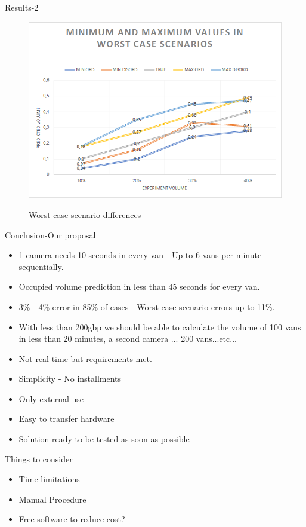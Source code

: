 \documentclass{beamer}
\begin{document}
\begin{frame}{Results-2}
\begin{figure}
	\includegraphics[width=0.9\linewidth]{Figures/chart2}
	\label{ch2}
	\caption{Worst case scenario differences}
\end{figure}
\end{frame}

\begin{frame}{Conclusion-Our proposal}
\begin{itemize}
	\item 1 camera needs 10 seconds in every van - Up to 6 vans per minute sequentially.
	\item Occupied volume prediction in less than 45 seconds for every van.
	\item 3\% - 4\% error in 85\% of cases - Worst case scenario errors up to 11\%.
	\item With less than 200gbp we should be able to calculate the volume of 100 vans in less than 20 minutes, a second camera ... 200 vans...etc...
	\item Not real time but requirements met.
	\item Simplicity - No installments
	\item Only external use
	\item Easy to transfer hardware
	\item Solution ready to be tested as soon as possible
\end{itemize}



\end{frame}

\begin{frame}{Things to consider}

\begin{itemize}
	\item Time limitations
	\item Manual Procedure
	\item Free software to reduce cost?
\end{itemize}
\end{frame}
\end{document}
